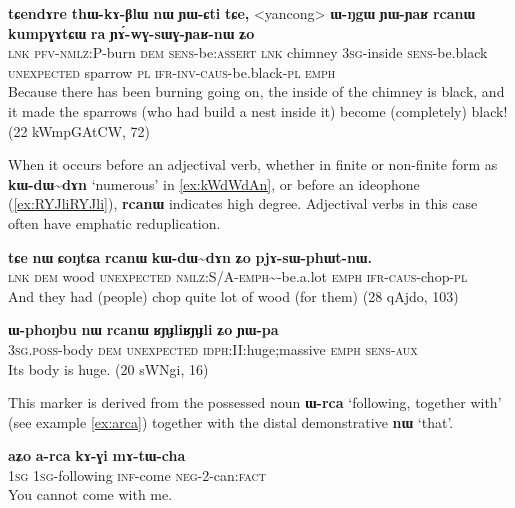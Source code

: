 \documentclass[oldfontcommands,oneside,a4paper,11pt]{article}
\newcommand{\ipa}[1]{\mbox{\phon\textbf{#1}}} %
\begin{document}
\begin{exe}
\ex \label{ex:YAwGsWGYaRnW}
\gll 
\ipa{tɕendɤre} 	\ipa{thɯ-kɤ-βlɯ} 	\ipa{nɯ} 	\ipa{ɲɯ-ɕti} 	\ipa{tɕe,} 	<yancong>	 \ipa{ɯ-ŋgɯ} 	\ipa{ɲɯ-ɲaʁ} 	\ipa{rcanɯ} 	\ipa{kumpɣɤtɕɯ} 	\ipa{ra} 	\ipa{ɲɤ́-wɣ-sɯɣ-ɲaʁ-nɯ} 	\ipa{ʑo} 	\\
\textsc{lnk} \textsc{pfv-nmlz}:P-burn \textsc{dem} \textsc{sens}-be:\textsc{assert} \textsc{lnk} chimney \textsc{3sg}-inside \textsc{sens}-be.black \textsc{unexpected} sparrow \textsc{pl} \textsc{ifr-inv-caus}-be.black-\textsc{pl} \textsc{emph} \\
\glt Because there has been burning going on, the inside of the chimney is black, and it made the sparrows (who had build a nest inside it) become (completely) black! (22 kWmpGAtCW, 72)
\end{exe}
When it occurs before an adjectival verb, whether in finite or non-finite form as \ipa{kɯ-dɯ\textasciitilde{}dɤn} `numerous' in \ref{ex:kWdWdAn}, or before an ideophone (\ref{ex:RYJliRYJli}), \ipa{rcanɯ} indicates high degree. Adjectival verbs in this case often have emphatic reduplication.

\begin{exe}
\ex \label{ex:kWdWdAn}
\gll \ipa{tɕe} 	\ipa{nɯ} 	\ipa{ɕoŋtɕa} 	\ipa{rcanɯ} 	\ipa{kɯ-dɯ\textasciitilde{}dɤn} 	\ipa{ʑo} 	\ipa{pjɤ-sɯ-phɯt-nɯ.} \\
\textsc{lnk} \textsc{dem} wood \textsc{unexpected} \textsc{nmlz}:S/A-\textsc{emph}\textasciitilde{}-be.a.lot \textsc{emph} \textsc{ifr-caus}-chop-\textsc{pl}\\
\glt And they had (people) chop quite lot of wood (for them) (28 qAjdo,  103)
\end{exe}

\begin{exe}
\ex \label{ex:RYJliRYJli}
\gll
\ipa{ɯ-phoŋbu} 	\ipa{nɯ} 	\ipa{rcanɯ} 	\ipa{ʁɲɟliʁɲɟli} 	\ipa{ʑo} 	\ipa{ɲɯ-pa} \\
\textsc{3sg.poss}-body \textsc{dem}  \textsc{unexpected} \textsc{idph}:II:huge;massive \textsc{emph} \textsc{sens}-\textsc{aux} \\
\glt Its body is huge. (20 sWNgi,  16)
\end{exe}

This marker is derived from the possessed noun  \ipa{ɯ-rca} `following, together with' (see example \ref{ex:arca}) together with the distal demonstrative \ipa{nɯ} `that'.

\begin{exe}
\ex \label{ex:arca}
\gll
\ipa{aʑo} 	\ipa{a-rca} 	\ipa{kɤ-ɣi} 	\ipa{mɤ-tɯ-cha} \\
\textsc{1sg} \textsc{1sg}-following \textsc{inf}-come \textsc{neg}-2-can:\textsc{fact} \\
\glt You cannot come with me.
\end{exe}
 
\end{document}
